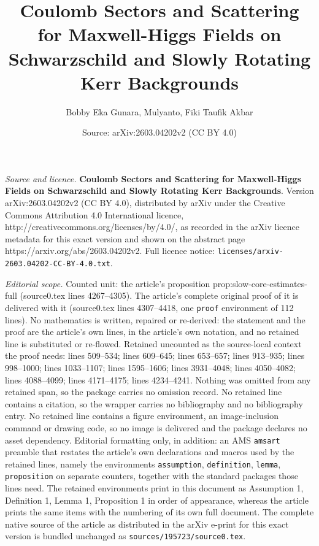 \documentclass[10pt,a4paper]{amsart}
\title{\Large\textbf{Coulomb Sectors and Scattering for Maxwell-Higgs Fields on Schwarzschild and Slowly Rotating Kerr Backgrounds}}
\author{Bobby Eka Gunara, Mulyanto, Fiki Taufik Akbar}
\date{Source: arXiv:2603.04202v2 (CC BY 4.0)}
\begin{document}
\maketitle

\noindent\emph{Source and licence.} \Large\textbf{Coulomb Sectors and Scattering for Maxwell-Higgs Fields on Schwarzschild and Slowly Rotating Kerr Backgrounds}. Version arXiv:2603.04202v2 (CC BY 4.0), distributed by arXiv under the Creative Commons Attribution 4.0 International licence, http://creativecommons.org/licenses/by/4.0/, as recorded in the arXiv licence metadata for this exact version and shown on the abstract page https://arxiv.org/abs/2603.04202v2. Full licence notice: \texttt{licenses/arxiv-2603.04202-CC-BY-4.0.txt}.\par\smallskip

\noindent\textit{Editorial scope.} Counted unit: the article's proposition prop:slow-core-estimates-full (source0.tex lines 4267--4305). The article's complete original proof of it is delivered with it (source0.tex lines 4307--4418, one \texttt{proof} environment of 112 lines). No mathematics is written, repaired or re-derived: the statement and the proof are the article's own lines, in the article's own notation, and no retained line is substituted or re-flowed.  Retained uncounted as the source-local context the proof needs: lines 509--534; lines 609--645; lines 653--657; lines 913--935; lines 998--1000; lines 1033--1107; lines 1595--1606; lines 3931--4048; lines 4050--4082; lines 4088--4099; lines 4171--4175; lines 4234--4241.  Nothing was omitted from any retained span, so the package carries no omission record.  No retained line contains a citation, so the wrapper carries no bibliography and no bibliography entry.  No retained line contains a figure environment, an image-inclusion command or drawing code, so no image is delivered and the package declares no asset dependency.  Editorial formatting only, in addition: an AMS \texttt{amsart} preamble that restates the article's own declarations and macros used by the retained lines, namely the environments \texttt{assumption}, \texttt{definition}, \texttt{lemma}, \texttt{proposition} on separate counters, together with the standard packages those lines need.  The retained environments print in this document as Assumption 1, Definition 1, Lemma 1, Proposition 1 in order of appearance, whereas the article prints the same items with the numbering of its own full document.  The complete native source of the article as distributed in the arXiv e-print for this exact version is bundled unchanged as \texttt{sources/195723/source0.tex}.
\end{document}
